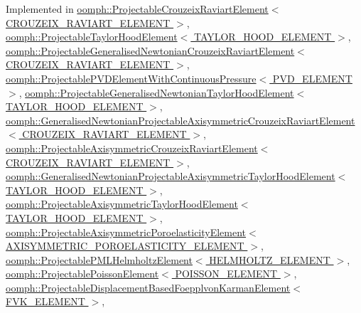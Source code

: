 Implemented in \hyperlink{classoomph_1_1ProjectableCrouzeixRaviartElement_a265001a5f6f758564d50fd498a1a9ca1}{oomph\+::\+Projectable\+Crouzeix\+Raviart\+Element$<$ C\+R\+O\+U\+Z\+E\+I\+X\+\_\+\+R\+A\+V\+I\+A\+R\+T\+\_\+\+E\+L\+E\+M\+E\+N\+T $>$}, \hyperlink{classoomph_1_1ProjectableTaylorHoodElement_a6def621e7df117d5e803e8e47f53c352}{oomph\+::\+Projectable\+Taylor\+Hood\+Element$<$ T\+A\+Y\+L\+O\+R\+\_\+\+H\+O\+O\+D\+\_\+\+E\+L\+E\+M\+E\+N\+T $>$}, \hyperlink{classoomph_1_1ProjectableGeneralisedNewtonianCrouzeixRaviartElement_aee4e12ec586f561d681f63dda4d1d3ce}{oomph\+::\+Projectable\+Generalised\+Newtonian\+Crouzeix\+Raviart\+Element$<$ C\+R\+O\+U\+Z\+E\+I\+X\+\_\+\+R\+A\+V\+I\+A\+R\+T\+\_\+\+E\+L\+E\+M\+E\+N\+T $>$}, \hyperlink{classoomph_1_1ProjectablePVDElementWithContinuousPressure_ab36cf9002b4eba6b706379b609979c52}{oomph\+::\+Projectable\+P\+V\+D\+Element\+With\+Continuous\+Pressure$<$ P\+V\+D\+\_\+\+E\+L\+E\+M\+E\+N\+T $>$}, \hyperlink{classoomph_1_1ProjectableGeneralisedNewtonianTaylorHoodElement_a1734ba15f3c3062571a83c3e23933e6a}{oomph\+::\+Projectable\+Generalised\+Newtonian\+Taylor\+Hood\+Element$<$ T\+A\+Y\+L\+O\+R\+\_\+\+H\+O\+O\+D\+\_\+\+E\+L\+E\+M\+E\+N\+T $>$}, \hyperlink{classoomph_1_1GeneralisedNewtonianProjectableAxisymmetricCrouzeixRaviartElement_acd407ccde8e91cbfa31bda2d62b606cf}{oomph\+::\+Generalised\+Newtonian\+Projectable\+Axisymmetric\+Crouzeix\+Raviart\+Element$<$ C\+R\+O\+U\+Z\+E\+I\+X\+\_\+\+R\+A\+V\+I\+A\+R\+T\+\_\+\+E\+L\+E\+M\+E\+N\+T $>$}, \hyperlink{classoomph_1_1ProjectableAxisymmetricCrouzeixRaviartElement_ae3768470d408e2d40f408e58d28792c2}{oomph\+::\+Projectable\+Axisymmetric\+Crouzeix\+Raviart\+Element$<$ C\+R\+O\+U\+Z\+E\+I\+X\+\_\+\+R\+A\+V\+I\+A\+R\+T\+\_\+\+E\+L\+E\+M\+E\+N\+T $>$}, \hyperlink{classoomph_1_1GeneralisedNewtonianProjectableAxisymmetricTaylorHoodElement_a89cf2117918a1d5074e26bb386aac730}{oomph\+::\+Generalised\+Newtonian\+Projectable\+Axisymmetric\+Taylor\+Hood\+Element$<$ T\+A\+Y\+L\+O\+R\+\_\+\+H\+O\+O\+D\+\_\+\+E\+L\+E\+M\+E\+N\+T $>$}, \hyperlink{classoomph_1_1ProjectableAxisymmetricTaylorHoodElement_a9008d18dbbbcfa54964766fbe2d31cde}{oomph\+::\+Projectable\+Axisymmetric\+Taylor\+Hood\+Element$<$ T\+A\+Y\+L\+O\+R\+\_\+\+H\+O\+O\+D\+\_\+\+E\+L\+E\+M\+E\+N\+T $>$}, \hyperlink{classoomph_1_1ProjectableAxisymmetricPoroelasticityElement_a1c98590aaf05d668c742afc430c0f5b6}{oomph\+::\+Projectable\+Axisymmetric\+Poroelasticity\+Element$<$ A\+X\+I\+S\+Y\+M\+M\+E\+T\+R\+I\+C\+\_\+\+P\+O\+R\+O\+E\+L\+A\+S\+T\+I\+C\+I\+T\+Y\+\_\+\+E\+L\+E\+M\+E\+N\+T $>$}, \hyperlink{classoomph_1_1ProjectablePMLHelmholtzElement_a7bae5d4f8a8716c9db2119094f9f08bc}{oomph\+::\+Projectable\+P\+M\+L\+Helmholtz\+Element$<$ H\+E\+L\+M\+H\+O\+L\+T\+Z\+\_\+\+E\+L\+E\+M\+E\+N\+T $>$}, \hyperlink{classoomph_1_1ProjectablePoissonElement_a9ee630c0affbb44077365bc9309ce1a1}{oomph\+::\+Projectable\+Poisson\+Element$<$ P\+O\+I\+S\+S\+O\+N\+\_\+\+E\+L\+E\+M\+E\+N\+T $>$}, \hyperlink{classoomph_1_1ProjectableDisplacementBasedFoepplvonKarmanElement_a18725fa9db7ade75bc789396bb91a04a}{oomph\+::\+Projectable\+Displacement\+Based\+Foepplvon\+Karman\+Element$<$ F\+V\+K\+\_\+\+E\+L\+E\+M\+E\+N\+T $>$}, 